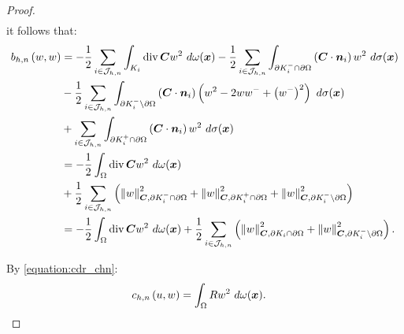 \begin{proof}
\begin{align*}
    \end{align*}
    it follows that:
    \begin{align*}
        b_{h, n} \left( w, w \right) &= - \frac12 \sum_{i \in \mathcal{J}_{h, n}} \int_{K_i} \operatorname*{div}{\bm{C}} w^2 ~ d \omega(\bm{x}) - \frac12 \sum_{i \in \mathcal{J}_{h, n}} \int_{\partial K_i^- \cap \partial \Omega} \left( \bm{C} \cdot \bm{n}_i \right) w^2 ~ d \sigma(\bm{x}) \\
        &- \frac12 \sum_{i \in \mathcal{J}_{h, n}} \int_{\partial K_i^- \setminus \partial \Omega} \left( \bm{C} \cdot \bm{n}_i \right) \left( w^2 - 2 ww^- + \left( w^- \right)^2 \right) ~ d \sigma(\bm{x}) \\
        &+ \sum_{i \in \mathcal{J}_{h, n}} \int_{\partial K_i^+ \cap \partial \Omega} \left( \bm{C} \cdot \bm{n}_i \right) w^2 ~ d \sigma(\bm{x}) \\
        &= - \frac12 \int_{\Omega} \operatorname*{div}{\bm{C}} w^2 ~ d \omega(\bm{x}) \\
        &+ \frac12 \sum_{i \in \mathcal{J}_{h, n}} \left( \left\lVert  w  \right\rVert_{\bm{C}, \partial K_i^- \cap \partial \Omega}^2 + \left\lVert  w  \right\rVert_{\bm{C}, \partial K_i^+ \cap \partial \Omega}^2 + \left\lVert  w  \right\rVert_{\bm{C}, \partial K_i^- \setminus \partial \Omega}^2 \right) \\
        &= - \frac12 \int_{\Omega} \operatorname*{div}{\bm{C}} w^2 ~ d \omega(\bm{x}) + \frac12 \sum_{i \in \mathcal{J}_{h, n}} \left( \left\lVert  w  \right\rVert_{\bm{C}, \partial K_i \cap \partial \Omega}^2 + \left\lVert  w  \right\rVert_{\bm{C}, \partial K_i^- \setminus \partial \Omega}^2 \right).
    \end{align*}

    By \cref{equation:cdr_chn}:
    \begin{align*}
        c_{h, n} \left( u, w \right) &= \int_{\Omega} R w^2 ~ d \omega(\bm{x}).
    \end{align*}


\end{proof}
